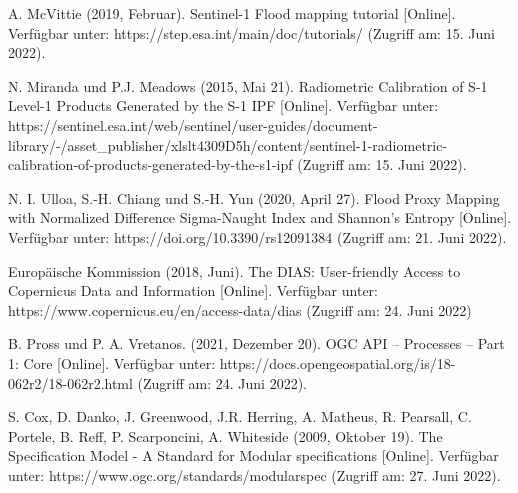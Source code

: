\begin{thebibliography}{1}
A. McVittie (2019, Februar). Sentinel-1 Flood mapping tutorial [Online]. Verfügbar unter: 
https://step.esa.int/main/doc/tutorials/
(Zugriff am: 15. Juni 2022).

N. Miranda und P.J. Meadows (2015, Mai 21). Radiometric Calibration of S-1 Level-1 Products Generated by the S-1 IPF [Online]. Verfügbar unter: 
https://sentinel.esa.int/web/sentinel/user-guides/document-library/-/asset\_publisher/xlslt4309D5h/content/sentinel-1-radiometric-calibration-of-products-generated-by-the-s1-ipf
(Zugriff am: 15. Juni 2022).

N. I. Ulloa, S.-H. Chiang und S.-H. Yun (2020, April 27). Flood Proxy Mapping with Normalized Difference Sigma-Naught Index and Shannon’s Entropy [Online]. Verfügbar unter: 
https://doi.org/10.3390/rs12091384 
(Zugriff am: 21. Juni 2022).

Europäische Kommission (2018, Juni). The DIAS: User-friendly Access to Copernicus Data and Information [Online]. Verfügbar unter:
https://www.copernicus.eu/en/access-data/dias
(Zugriff am: 24. Juni 2022)

B. Pross und P. A. Vretanos. (2021, Dezember 20). OGC API – Processes – Part 1: Core [Online]. Verfügbar unter: 
https://docs.opengeospatial.org/is/18-062r2/18-062r2.html 
(Zugriff am: 24. Juni 2022).

S. Cox, D. Danko, J. Greenwood, J.R. Herring, A. Matheus, R. Pearsall, C. Portele, B. Reff, P. Scarponcini, A. Whiteside (2009, Oktober 19). The Specification Model - A Standard for Modular specifications [Online]. Verfügbar unter: 
https://www.ogc.org/standards/modularspec 
(Zugriff am: 27. Juni 2022).

\end{thebibliography}